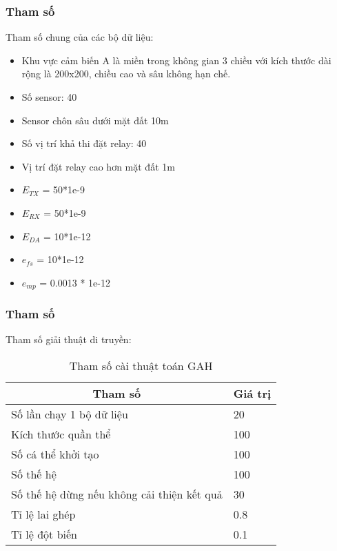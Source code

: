 \begin{frame}
    \frametitle{Tham số}
    Tham số chung của các bộ dữ liệu:
    \begin{itemize}
        \item Khu vực cảm  biến A là miền trong không gian 3 chiều với kích thước dài rộng là 200x200, chiều cao và sâu không hạn chế.
        \item Số sensor: 40  
        \item Sensor chôn sâu dưới mặt đất 10m
        \item Số vị trí khả thi đặt relay: 40 
        \item Vị trí đặt relay cao hơn mặt đất 1m
        \item $E_{TX}$ = 50*1e-9
        \item $E_{RX}$ = 50*1e-9
        \item $E_{DA}$ = 10*1e-12
        \item $e_{fs}$ = 10*1e-12
        \item $e_{mp}$ = 0.0013 * 1e-12
    \end{itemize}
\end{frame}

\begin{frame}
    \frametitle{Tham số}
    Tham số giải thuật di truyền:
    \begin{table}[H]
        \begin{tabularx}{\textwidth}{|X|X|}
            \hline
            \multicolumn{1}{|c|}{\textbf{Tham số}} & \multicolumn{1}{c|}{\textbf{Giá trị}}                    \\ \hline
            Số lần chạy 1 bộ dữ liệu  &  20                                                 \\ \hline
            Kích thước quần thể  & 100                                                      \\ \hline
            Số cá thể khởi tạo & 100                                                        \\ \hline
            Số thế hệ & 100                                                                 \\ \hline
            Số thế hệ dừng nếu không cải thiện kết quả & 30                                 \\ \hline
            Tỉ lệ lai ghép & 0.8                                                            \\ \hline
            Tỉ lệ đột biến   & 0.1                                                          \\ \hline
        \end{tabularx}
        \caption{Tham số cài thuật toán GAH}
    \end{table}
\end{frame}

